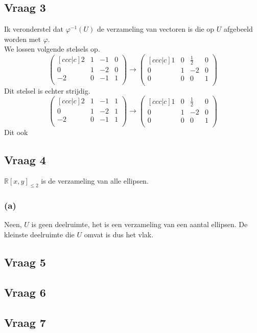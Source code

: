 \documentclass[lineaire_algebra_oplossingen.tex]{subfiles}
\begin{document}
\subsection{Vraag 3}
Ik veronderstel dat $\varphi^{-1}(U)$ de verzameling van vectoren is die op $U$ afgebeeld worden met $\varphi$.\\
We lossen volgende stelsels op.
\[
\begin{pmatrix}[c c c | c]
2 & 1 & -1 & 0\\
0 & 1 & -2 & 0\\
-2 & 0 &-1 & 1\\
\end{pmatrix}
\rightarrow
\begin{pmatrix}[c c c | c]
1 & 0 & \frac{1}{2} & 0\\
0 & 1 & -2 & 0\\
0 & 0 & 0 & 1\\
\end{pmatrix}
\]
Dit stelsel is echter strijdig. %
\[
\begin{pmatrix}[c c c | c]
2 & 1 & -1 & 1\\
0 & 1 & -2 & 1\\
-2 & 0 &-1 & 1\\
\end{pmatrix}
\rightarrow
\begin{pmatrix}[c c c | c]
1 & 0 & \frac{1}{2} & 0\\
0 & 1 & -2 & 0\\
0 & 0 & 0 & 1\\
\end{pmatrix}
\]
Dit ook %


\subsection{Vraag 4}
$\mathbb{R}[x,y]_{\le 2}$ is de verzameling van alle ellipsen.
\subsubsection*{(a)}
Neen, $U$ is geen deelruimte, het is een verzameling van een aantal ellipsen. De kleinste deelruimte die $U$ omvat is dus het vlak.

\subsection{Vraag 5}

\subsection{Vraag 6}

\subsection{Vraag 7}
\end{document}
